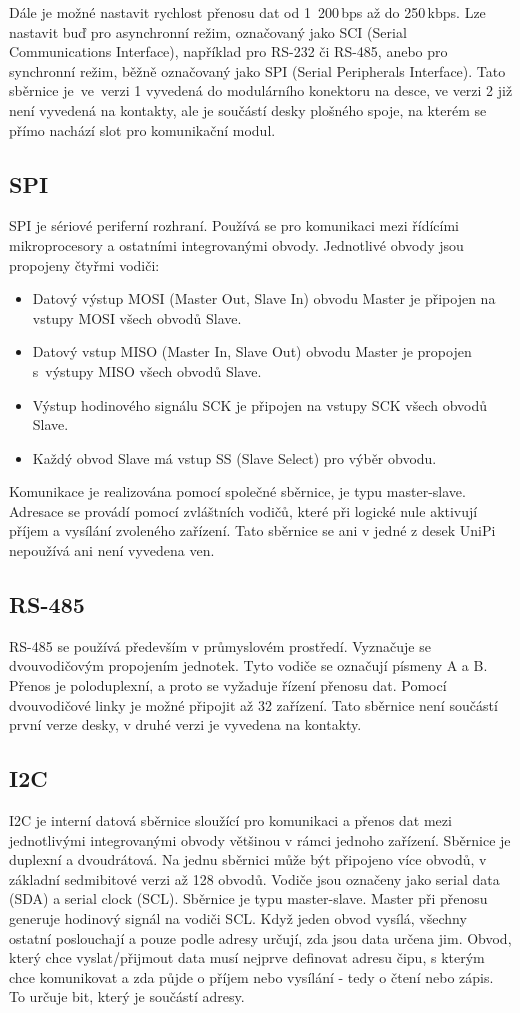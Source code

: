 Dále je možné nastavit rychlost přenosu dat od 1~200\,bps až do 250\,kbps. Lze nastavit buď pro asynchronní režim, označovaný jako SCI (Serial Communications Interface), například pro RS-232 či RS-485, anebo pro synchronní režim, běžně označovaný jako SPI (Serial Peripherals Interface). Tato sběrnice je~ve~verzi 1 vyvedená do modulárního konektoru na desce, ve verzi 2 již není vyvedená na kontakty, ale je součástí desky plošného spoje, na kterém se přímo nachází slot pro komunikační modul.


\subsection{SPI}
SPI je sériové periferní rozhraní. Používá se pro komunikaci mezi řídícími mikroprocesory a ostatními integrovanými obvody. Jednotlivé obvody jsou propojeny čtyřmi vodiči:
\begin{itemize}
	\item Datový výstup MOSI (Master Out, Slave In) obvodu Master je připojen na vstupy MOSI všech obvodů Slave.
	\item Datový vstup MISO (Master In, Slave Out) obvodu Master je propojen s~výstupy MISO všech obvodů Slave.
	\item Výstup hodinového signálu SCK je připojen na vstupy SCK všech obvodů Slave.
	\item Každý obvod Slave má vstup SS (Slave Select) pro výběr obvodu.
\end{itemize}
Komunikace je realizována pomocí společné sběrnice, je typu master-slave. Adresace se provádí pomocí zvláštních vodičů, které při logické nule aktivují příjem a vysílání zvoleného zařízení. Tato sběrnice se ani v jedné z desek UniPi nepoužívá ani není vyvedena ven.

\subsection{RS-485}
RS-485 se používá především v průmyslovém prostředí. Vyznačuje se dvouvodičovým propojením jednotek. Tyto vodiče se označují písmeny A a B. Přenos je poloduplexní, a proto se vyžaduje řízení přenosu dat. Pomocí dvouvodičové linky je možné připojit až 32 zařízení. Tato sběrnice není součástí první verze desky, v druhé verzi je vyvedena na kontakty.

\subsection{I2C}
I2C je interní datová sběrnice sloužící pro komunikaci a přenos dat mezi jednotlivými integrovanými obvody většinou v rámci jednoho zařízení. Sběrnice je duplexní a dvoudrátová. Na jednu sběrnici může být připojeno více obvodů, v základní sedmibitové verzi až 128 obvodů.
Vodiče jsou označeny jako serial data (SDA) a serial clock (SCL). Sběrnice je typu master-slave. Master při přenosu generuje hodinový signál na vodiči SCL. Když jeden obvod vysílá, všechny ostatní poslouchají a pouze podle adresy určují, zda jsou data určena jim. Obvod, který chce vyslat/přijmout data musí nejprve definovat adresu čipu, s kterým chce komunikovat a zda půjde o příjem nebo vysílání - tedy o čtení nebo zápis. To určuje bit, který je součástí adresy. 


